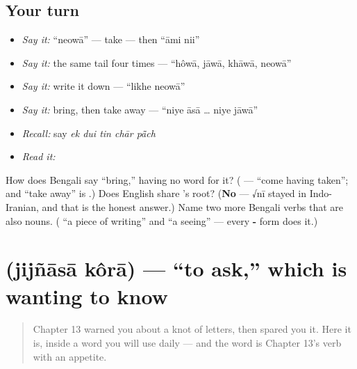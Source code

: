 \subsection*{Your turn}
\begin{itemize}
\raggedright
  \item \emph{Say it:} \textquotedblleft{}neowā\textquotedblright{} — take — then \textquotedblleft{}āmi nii\textquotedblright{}
  \item \emph{Say it:} the same tail four times — \textquotedblleft{}hôwā, jāwā, khāwā, neowā\textquotedblright{}
  \item \emph{Say it:} write it down — \textquotedblleft{}likhe neowā\textquotedblright{}
  \item \emph{Say it:} bring, then take away — \textquotedblleft{}niye āsā … niye jāwā\textquotedblright{}
  \item \emph{Recall:} say \emph{ek dui tin chār pā̃ch}
  \item \emph{Read it:} \textbf{}
\end{itemize}

\begin{tcolorbox}[breakable,colback=teal!4,colframe=teal!35!black,title={Before you move on}]
How does Bengali say \textquotedblleft{}bring,\textquotedblright{} having no word for it? (\textbf{ } — \textquotedblleft{}come having taken\textquotedblright{}; and \textquotedblleft{}take away\textquotedblright{} is  .) Does English share 's root? (\textbf{No} — √nī stayed in Indo-Iranian, and that is the honest answer.) Name two more Bengali verbs that are also nouns. (\textbf{} \textquotedblleft{}a piece of writing\textquotedblright{} and \textbf{} \textquotedblleft{}a seeing\textquotedblright{} — every \textbf{-} form does it.)
\end{tcolorbox}
\section[\texorpdfstring{\bn{জিজ্ঞাসা} \bn{করা} (jijñāsā kôrā)}{জিজ্ঞাসা করা (jijñāsā kôrā)}]{  (jijñāsā kôrā) — \textquotedblleft{}to ask,\textquotedblright{} which is wanting to know}

\label{lesson:BN-C09-jijnasa-kora}



\begin{quote}
Chapter 13 warned you about a knot of letters, then spared you it. Here it is, inside a word you will use daily — and the word is Chapter 13's verb with an appetite.
\end{quote}

